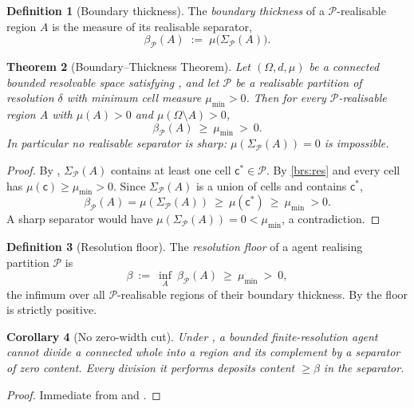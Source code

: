 \documentclass[11pt,twocolumn,a4paper]{article}
\theoremstyle{thmstyle}
\newtheorem{theorem}{Theorem}[section]
\newtheorem{corollary}[theorem]{Corollary}
\theoremstyle{definition}
\newtheorem{definition}[theorem]{Definition}
\theoremstyle{remark}
\newcommand{\Space}{\Omega}
\newcommand{\thick}{\beta}
\newcommand{\reso}{\delta}
\newcommand{\Part}{\mathscr{P}}
\newcommand{\cell}{\mathsf{c}}
\begin{document}
\begin{definition}[Boundary thickness]
\label{def:thickness}
The \emph{boundary thickness} of a $\Part$-realisable region $A$ is the measure
of its realisable separator,
\[
\thick_\Part(A)\;:=\;\mu\bigl(\Sigma_\Part(A)\bigr).
\]
\end{definition}

\begin{theorem}[Boundary--Thickness Theorem]
\label{thm:thickness}
Let $(\Space,d,\mu)$ be a connected bounded resolvable space satisfying
, and let $\Part$ be a realisable partition of resolution $\reso$
with minimum cell measure $\mu_{\min}>0$. Then for every $\Part$-realisable
region $A$ with $\mu(A)>0$ and $\mu(\Space\setminus A)>0$,
\[
\boxed{\ \thick_\Part(A)\ \ge\ \mu_{\min}\ >\ 0.\ }
\]
In particular no realisable separator is sharp: $\mu(\Sigma_\Part(A))=0$ is
impossible.
\end{theorem}

\begin{proof}
By , $\Sigma_\Part(A)$ contains at least one cell
$\cell^\ast\in\Part$. By \ref{brs:res} and  every cell
has $\mu(\cell)\ge\mu_{\min}>0$. Since $\Sigma_\Part(A)$ is a union of cells and
contains $\cell^\ast$,
\[
\thick_\Part(A)=\mu(\Sigma_\Part(A))\ \ge\ \mu(\cell^\ast)\ \ge\ \mu_{\min}\ >0 .
\]
A sharp separator would have $\mu(\Sigma_\Part(A))=0<\mu_{\min}$, a
contradiction.
\end{proof}

\begin{definition}[Resolution floor]
\label{def:floor}
The \emph{resolution floor} of a agent realising partition $\Part$ is
\[
\thick\ :=\ \inf_{A}\ \thick_\Part(A)\ \ge\ \mu_{\min}\ >\ 0,
\]
the infimum over all $\Part$-realisable regions of their boundary thickness. By
 the floor is strictly positive.
\end{definition}

\begin{corollary}[No zero-width cut]
\label{cor:no-zero-cut}
Under , a bounded finite-resolution agent cannot divide a
connected whole into a region and its complement by a separator of zero content.
Every division it performs deposits content $\ge\thick$ in the separator.
\end{corollary}

\begin{proof}
Immediate from  and .
\end{proof}
\end{document}
